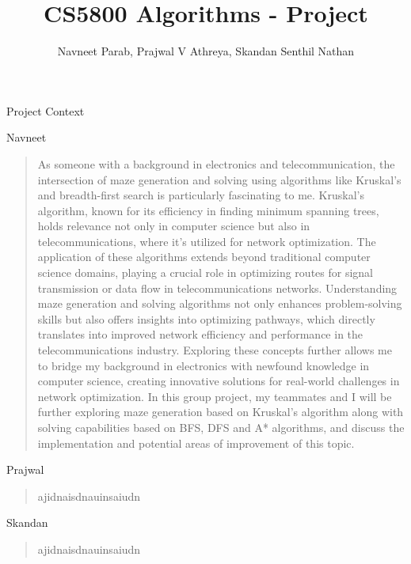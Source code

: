 \documentclass{amsart}
\author{Navneet Parab, Prajwal V Athreya, Skandan Senthil Nathan}
\title{CS5800 Algorithms - Project}
\begin{document}
\maketitle

\begin{section}{Project Context}

    \begin{subsection}{Navneet}
        \begin{quote}
            As someone with a background in electronics and telecommunication, the intersection of maze generation and solving using algorithms like Kruskal's and breadth-first search is particularly fascinating to me. Kruskal's algorithm, known for its efficiency in finding minimum spanning trees, holds relevance not only in computer science but also in telecommunications, where it's utilized for network optimization. The application of these algorithms extends beyond traditional computer science domains, playing a crucial role in optimizing routes for signal transmission or data flow in telecommunications networks. Understanding maze generation and solving algorithms not only enhances problem-solving skills but also offers insights into optimizing pathways, which directly translates into improved network efficiency and performance in the telecommunications industry. Exploring these concepts further allows me to bridge my background in electronics with newfound knowledge in computer science, creating innovative solutions for real-world challenges in network optimization. In this group project, my teammates and I will be further exploring maze generation based on Kruskal’s algorithm along with solving capabilities based on BFS, DFS and A* algorithms, and discuss the implementation and potential areas of improvement of this topic.
        \end{quote}
    \end{subsection}

    \begin{subsection}{Prajwal}
        \begin{quote}
            ajidnaisdnauinsaiudn    
        \end{quote}
    \end{subsection}

    \begin{subsection}{Skandan}
        \begin{quote}
            ajidnaisdnauinsaiudn    
        \end{quote}
    \end{subsection}
    
\end{section}
\end{document}
